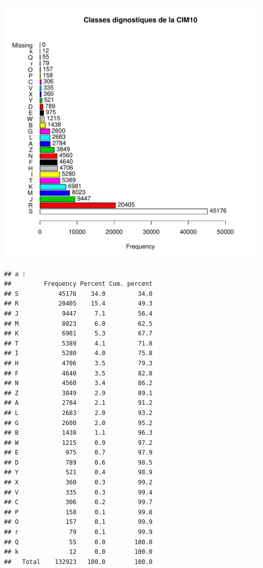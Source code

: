 \documentclass[12pt,english,french,twoside]{report}\usepackage[]{graphicx}\usepackage[]{color}
\makeatletter
\def\maxwidth{ %
  \ifdim\Gin@nat@width>\linewidth
    \linewidth
  \else
    \Gin@nat@width
  \fi
}
\newenvironment{kframe}{%
 \def\at@end@of@kframe{}%
 \ifinner\ifhmode%
  \def\at@end@of@kframe{\end{minipage}}%
  \begin{minipage}{\columnwidth}%
 \fi\fi%
 \def\FrameCommand##1{\hskip\@totalleftmargin \hskip-\fboxsep
 \colorbox{shadecolor}{##1}\hskip-\fboxsep
     \hskip-\linewidth \hskip-\@totalleftmargin \hskip\columnwidth}%
 \MakeFramed {\advance\hsize-\width
   \@totalleftmargin\z@ \linewidth\hsize
   \@setminipage}}%
 {\par\unskip\endMakeFramed%
 \at@end@of@kframe}
\newenvironment{knitrout}{}{} %
\makeatother
\begin{document}
\begin{knitrout}
\color{fgcolor}
\includegraphics[width=\maxwidth]{figure/class_cim10} 
\begin{kframe}\begin{verbatim}
## a :  
##         Frequency Percent Cum. percent
## S           45176    34.0         34.0
## R           20405    15.4         49.3
## J            9447     7.1         56.4
## M            8023     6.0         62.5
## K            6981     5.3         67.7
## T            5389     4.1         71.8
## I            5280     4.0         75.8
## H            4706     3.5         79.3
## F            4640     3.5         82.8
## N            4560     3.4         86.2
## Z            3849     2.9         89.1
## A            2784     2.1         91.2
## L            2683     2.0         93.2
## G            2600     2.0         95.2
## B            1438     1.1         96.3
## W            1215     0.9         97.2
## E             975     0.7         97.9
## D             789     0.6         98.5
## Y             521     0.4         98.9
## X             360     0.3         99.2
## V             335     0.3         99.4
## C             306     0.2         99.7
## P             158     0.1         99.8
## O             157     0.1         99.9
## r              79     0.1         99.9
## Q              55     0.0        100.0
## k              12     0.0        100.0
##   Total    132923   100.0        100.0
\end{verbatim}
\end{kframe}
\end{knitrout}
\end{document}
